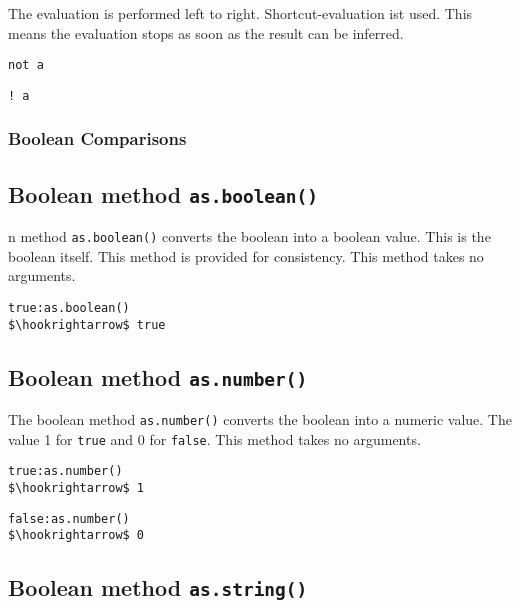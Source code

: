 \documentclass[11pt,a4paper]{scrbook}
\begin{document}
The evaluation is performed left to right. Shortcut-evaluation ist used. This
means the evaluation stops as soon as the result can be inferred.

\begin{lstlisting}[language=BibTool]
not a
\end{lstlisting}

\begin{lstlisting}[language=BibTool]
! a
\end{lstlisting}

\subsubsection{Boolean Comparisons}




\subsection{Boolean method \texttt{as.boolean()}}
n method \texttt{as.boolean()} converts the boolean into a boolean
value. This is the boolean itself. This method is provided for consistency.
This method takes no arguments.

\begin{lstlisting}[language=BibTool,mathescape=true]
true:as.boolean()
$\hookrightarrow$ true
\end{lstlisting}

\subsection{Boolean method \texttt{as.number()}}

The boolean method \texttt{as.number()} converts the boolean into a numeric
value. The value 1 for \verb|true| and 0 for \verb|false|. This method takes
no arguments.

\begin{lstlisting}[language=BibTool,mathescape=true]
true:as.number()
$\hookrightarrow$ 1
\end{lstlisting}

\begin{lstlisting}[language=BibTool,mathescape=true]
false:as.number()
$\hookrightarrow$ 0
\end{lstlisting}

\subsection{Boolean method \texttt{as.string()}}
\end{document}
